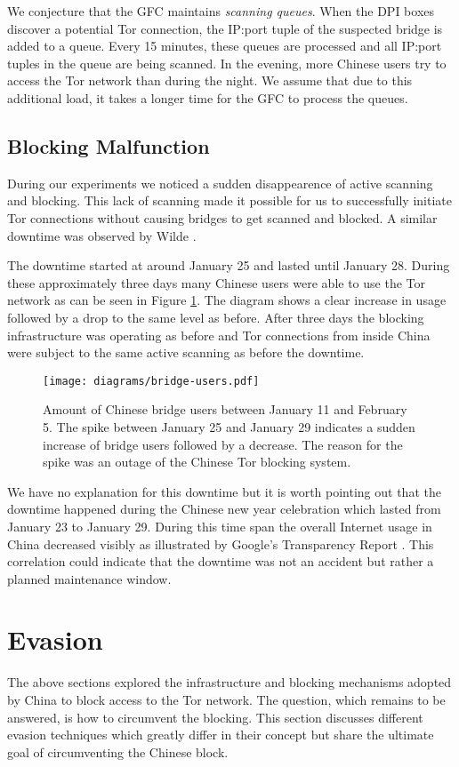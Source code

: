 \documentclass[runningheads,a4paper]{llncs}
\begin{document}
We conjecture that the GFC maintains \emph{scanning queues}. When the DPI boxes discover a potential
Tor connection, the IP:port tuple of the suspected bridge is added to a queue. Every 15 minutes,
these queues are processed and all IP:port tuples in the queue are being scanned. In the evening,
more Chinese users try to access the Tor network than during the night. We assume that due to this
additional load, it takes a longer time for the GFC to process the queues.

\subsection{Blocking Malfunction}
During our experiments we noticed a sudden disappearence of active scanning and blocking. This lack
of scanning made it possible for us to successfully initiate Tor connections without causing bridges
to get scanned and blocked. A similar downtime was observed by Wilde \cite{tpo5}.

The downtime started at around January 25 and lasted until January 28. During these
approximately three days many Chinese users were able to use the Tor network as can be seen in
Figure \ref{fig:offline}. The diagram shows a clear increase in usage followed by a drop to the same
level as before. After three days the blocking infrastructure was operating as before and Tor
connections from inside China were subject to the same active scanning as before the downtime.

\begin{figure}
\centering
\texttt{[image: diagrams/bridge-users.pdf]}
\caption{Amount of Chinese bridge users between January 11 and February 5. The spike between January
25 and January 29 indicates a sudden increase of bridge users followed by a decrease. The reason for
the spike was an outage of the Chinese Tor blocking system.}
\label{fig:offline}
\end{figure}

We have no explanation for this downtime but it is worth pointing out that the downtime happened
during the Chinese new year celebration which lasted from January 23 to January 29. During this time
span the overall Internet usage in China decreased visibly as illustrated by Google's Transparency
Report \cite{trans}. This correlation could indicate that the downtime was not an accident but
rather a planned maintenance window.


\section{Evasion}
\label{sec:evasion}
The above sections explored the infrastructure and blocking mechanisms adopted by China to block
access to the Tor network. The question, which remains to be answered, is how to circumvent the
blocking. This section discusses different evasion techniques which greatly differ in their concept
but share the ultimate goal of circumventing the Chinese block.
\end{document}
